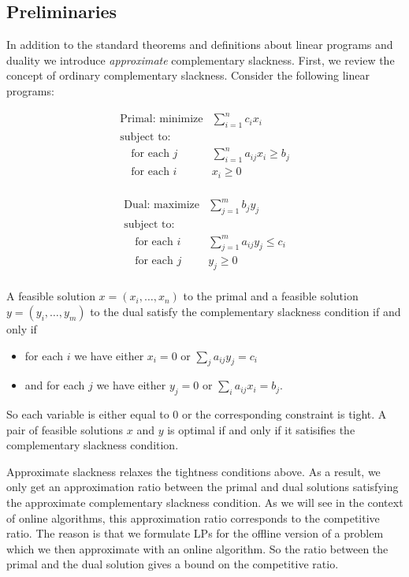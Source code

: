 \subsection{Preliminaries}
In addition to the standard theorems and definitions about linear programs and duality we introduce \emph{approximate} complementary slackness.
First, we review the concept of ordinary complementary slackness.
Consider the following linear programs:

\[
\begin{array}{lr}
  \textrm{Primal: minimize}   & \sum^n_{i=1} c_i x_i  \\
  \textrm{subject to:} & \\
  \quad \textrm{for each $j$} & \sum_{i=1}^n a_{ij} x_i \geq b_j \\
  \quad \textrm{for each $i$} & x_i \geq 0 \\
\end{array}
\]

\[
\begin{array}{lr}
  \textrm{Dual: maximize}   & \sum^m_{j=1} b_j y_j  \\
  \textrm{subject to:} & \\
  \quad \textrm{for each $i$} & \sum_{j=1}^m a_{ij} y_j \leq c_i \\
  \quad \textrm{for each $j$} & y_j \geq 0 \\
\end{array}
\]

A feasible solution $x = (x_i, \ldots, x_n)$ to the primal and a feasible solution $y = (y_i, \ldots, y_m)$ to the dual satisfy the complementary slackness condition if and only if
\begin{itemize}
\item for each $i$ we have either $x_i = 0$ or $\sum_{j} a_{ij}y_j = c_i$
\item and for each $j$ we have either $y_j = 0$ or $\sum_{i} a_{ij} x_i = b_j$.
\end{itemize}
So each variable is either equal to 0 or the corresponding constraint is tight.
A pair of feasible solutions $x$ and $y$ is optimal if and only if it satisifies the complementary slackness condition.

Approximate slackness relaxes the tightness conditions above.
As a result, we only get an approximation ratio between the primal and dual solutions satisfying the approximate complementary slackness condition.
As we will see in the context of online algorithms, this approximation ratio corresponds to the competitive ratio.
The reason is that we formulate LPs for the offline version of a problem which we then approximate with an online algorithm.
So the ratio between the primal and the dual solution gives a bound on the competitive ratio.

